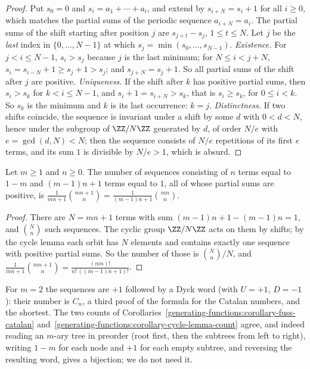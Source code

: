 \begin{proof}
Put $s_0 = 0$ and $s_i = a_1 + \cdots + a_i$, and extend by $s_{i+N} = s_i + 1$ for all $i \geq 0$, which matches the partial sums of the periodic sequence $a_{i+N} = a_i$. The partial sums of the
shift starting after position $j$ are $s_{j+t} - s_j$, $1 \leq t \leq N$. Let $j$ be the \emph{last} index in $\{0, \ldots, N - 1\}$ at which $s_j = \min(s_0, \ldots, s_{N-1})$.
\emph{Existence.} For $j < i \leq N - 1$, $s_i > s_j$ because $j$ is the last minimum; for $N \leq i < j + N$, $s_i = s_{i-N} + 1 \geq s_j + 1 > s_j$; and $s_{j+N} = s_j + 1$. So all partial sums of the
shift after $j$ are positive.
\emph{Uniqueness.} If the shift after $k$ has positive partial sums, then $s_i > s_k$ for $k < i \leq N - 1$, and $s_i + 1 = s_{i+N} > s_k$, that is $s_i \geq s_k$, for $0 \leq i < k$. So $s_k$ is the
minimum and $k$ is its last occurrence: $k = j$.
\emph{Distinctness.} If two shifts coincide, the sequence is invariant under a shift by some $d$ with $0 < d < N$, hence under the subgroup of $\ZZ/N\ZZ$ generated by $d$, of order $N/e$ with
$e = \gcd(d, N) < N$; then the sequence consists of $N/e$ repetitions of its first $e$ terms, and its sum $1$ is divisible by $N/e > 1$, which is absurd.
\end{proof}

\begin{corollary}\label{generating-functions:corollary-cycle-lemma-count}
Let $m \geq 1$ and $n \geq 0$. The number of sequences consisting of $n$ terms equal to $1 - m$ and $(m - 1)n + 1$ terms equal to $1$, all of whose partial sums are positive, is
$\frac{1}{mn + 1}\binom{mn + 1}{n} = \frac{1}{(m - 1)n + 1}\binom{mn}{n}$.
\end{corollary}

\begin{proof}
There are $N = mn + 1$ terms with sum $(m - 1)n + 1 - (m - 1)n = 1$, and $\binom{N}{n}$ such sequences. The cyclic group $\ZZ/N\ZZ$ acts on them by shifts; by the cycle lemma each orbit has $N$
elements and contains exactly one sequence with positive partial sums. So the number of those is $\binom{N}{n}/N$, and $\frac{1}{mn + 1}\binom{mn + 1}{n} = \frac{(mn)!}{n!\,((m - 1)n + 1)!}$.
\end{proof}

For $m = 2$ the sequences are $+1$ followed by a Dyck word (with $U = +1$, $D = -1$): their number is $C_n$, a third proof of the formula for the Catalan numbers, and the shortest. The two counts of
Corollaries~\ref{generating-functions:corollary-fuss-catalan} and~\ref{generating-functions:corollary-cycle-lemma-count} agree, and indeed reading an $m$-ary tree in preorder (root first, then
the subtrees from left to right), writing $1 - m$ for each node and $+1$ for each empty subtree, and reversing the resulting word, gives a bijection; we do not need it.

